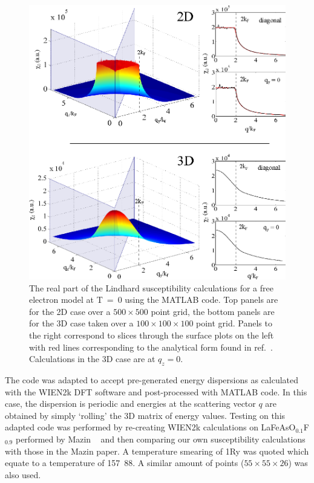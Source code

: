 \begin{figure}[htbp]
    \begin{center}
        \includegraphics[scale=0.9]{Chapter-ExperimentalTechnique/Figures/Susceptibility/FreeElectron/FreeElectron}
        \caption{The real part of the Lindhard susceptibility calculations for a free electron model at \unit{T=0}{\kelvin} using the MATLAB  code. Top panels are for the 2D case over a $500\times500$ point grid, the bottom panels are for the 3D case taken over a $100\times100\times100$ point grid. Panels to the right correspond to slices through the surface plots on the left with red lines corresponding to the analytical form found in ref.~\cite{Blundell2001}. Calculations in the 3D case are at $q_z=0$.}
        \label{Fig:Exp:FreeElectronSusceptibility}
    \end{center}
\end{figure}


The code was adapted to accept pre-generated energy dispersions as calculated with the WIEN2k DFT software and post-processed with MATLAB code. In this case, the dispersion is periodic and energies at the scattering vector $q$ are obtained by simply `rolling' the 3D matrix of energy values. Testing on this adapted code was performed by re-creating WIEN2k calculations on LaFeAsO$_{0.1}$F$_{0.9}$ performed by Mazin \etal~\cite{Mazin2008} and then comparing our own susceptibility calculations with those in the Mazin paper. A temperature smearing of \unit{1}{\milli\textrm{Ry}} was quoted which equate to a temperature of \unit{157.88}{\kelvin}. A similar amount of points ($55\times55\times26$) was also used.


